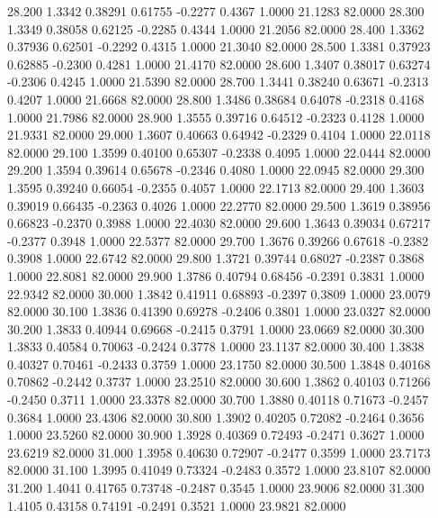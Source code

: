   28.200   1.3342   0.38291   0.61755  -0.2277   0.4367   1.0000  21.1283  82.0000
  28.300   1.3349   0.38058   0.62125  -0.2285   0.4344   1.0000  21.2056  82.0000
  28.400   1.3362   0.37936   0.62501  -0.2292   0.4315   1.0000  21.3040  82.0000
  28.500   1.3381   0.37923   0.62885  -0.2300   0.4281   1.0000  21.4170  82.0000
  28.600   1.3407   0.38017   0.63274  -0.2306   0.4245   1.0000  21.5390  82.0000
  28.700   1.3441   0.38240   0.63671  -0.2313   0.4207   1.0000  21.6668  82.0000
  28.800   1.3486   0.38684   0.64078  -0.2318   0.4168   1.0000  21.7986  82.0000
  28.900   1.3555   0.39716   0.64512  -0.2323   0.4128   1.0000  21.9331  82.0000
  29.000   1.3607   0.40663   0.64942  -0.2329   0.4104   1.0000  22.0118  82.0000
  29.100   1.3599   0.40100   0.65307  -0.2338   0.4095   1.0000  22.0444  82.0000
  29.200   1.3594   0.39614   0.65678  -0.2346   0.4080   1.0000  22.0945  82.0000
  29.300   1.3595   0.39240   0.66054  -0.2355   0.4057   1.0000  22.1713  82.0000
  29.400   1.3603   0.39019   0.66435  -0.2363   0.4026   1.0000  22.2770  82.0000
  29.500   1.3619   0.38956   0.66823  -0.2370   0.3988   1.0000  22.4030  82.0000
  29.600   1.3643   0.39034   0.67217  -0.2377   0.3948   1.0000  22.5377  82.0000
  29.700   1.3676   0.39266   0.67618  -0.2382   0.3908   1.0000  22.6742  82.0000
  29.800   1.3721   0.39744   0.68027  -0.2387   0.3868   1.0000  22.8081  82.0000
  29.900   1.3786   0.40794   0.68456  -0.2391   0.3831   1.0000  22.9342  82.0000
  30.000   1.3842   0.41911   0.68893  -0.2397   0.3809   1.0000  23.0079  82.0000
  30.100   1.3836   0.41390   0.69278  -0.2406   0.3801   1.0000  23.0327  82.0000
  30.200   1.3833   0.40944   0.69668  -0.2415   0.3791   1.0000  23.0669  82.0000
  30.300   1.3833   0.40584   0.70063  -0.2424   0.3778   1.0000  23.1137  82.0000
  30.400   1.3838   0.40327   0.70461  -0.2433   0.3759   1.0000  23.1750  82.0000
  30.500   1.3848   0.40168   0.70862  -0.2442   0.3737   1.0000  23.2510  82.0000
  30.600   1.3862   0.40103   0.71266  -0.2450   0.3711   1.0000  23.3378  82.0000
  30.700   1.3880   0.40118   0.71673  -0.2457   0.3684   1.0000  23.4306  82.0000
  30.800   1.3902   0.40205   0.72082  -0.2464   0.3656   1.0000  23.5260  82.0000
  30.900   1.3928   0.40369   0.72493  -0.2471   0.3627   1.0000  23.6219  82.0000
  31.000   1.3958   0.40630   0.72907  -0.2477   0.3599   1.0000  23.7173  82.0000
  31.100   1.3995   0.41049   0.73324  -0.2483   0.3572   1.0000  23.8107  82.0000
  31.200   1.4041   0.41765   0.73748  -0.2487   0.3545   1.0000  23.9006  82.0000
  31.300   1.4105   0.43158   0.74191  -0.2491   0.3521   1.0000  23.9821  82.0000
